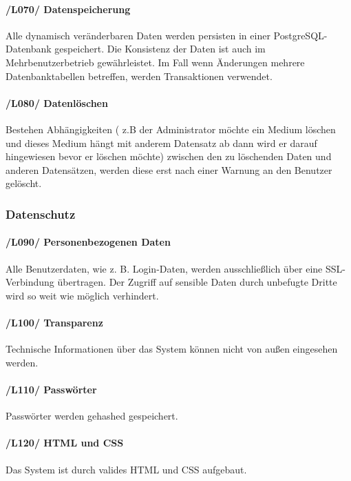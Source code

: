 \documentclass{article}
\begin{document}
   \paragraph{/L070/ \label{070} Datenspeicherung}
   Alle dynamisch veränderbaren Daten werden persisten in einer PostgreSQL-Datenbank gespeichert. Die Konsistenz der Daten ist auch im Mehrbenutzerbetrieb gewährleistet. Im Fall wenn  Änderungen mehrere Datenbanktabellen betreffen, werden Transaktionen verwendet.
  
   \paragraph{/L080/ \label{080} Datenlöschen}
   
  Bestehen Abhängigkeiten ( z.B der Administrator möchte ein Medium löschen und dieses Medium hängt mit anderem Datensatz ab dann wird er  darauf hingewiesen bevor  er  löschen möchte)  zwischen den zu löschenden Daten und anderen Datensätzen, werden diese erst nach einer Warnung an den Benutzer gelöscht.
  
\subsubsection{Datenschutz}
	\paragraph{/L090/ \label{L090} 
	Personenbezogenen Daten} 
	Alle Benutzerdaten, wie z. B. Login-Daten, werden ausschließlich über eine SSL-Verbindung übertragen. Der Zugriff auf sensible Daten durch unbefugte Dritte wird so weit wie möglich verhindert.
		    
	\paragraph{/L100/ \label{L100} Transparenz}
    Technische Informationen über das System können nicht von außen eingesehen werden.
		   
   \paragraph{/L110/ \label{L110} Passwörter} Passwörter werden gehashed gespeichert.
   
    \paragraph{/L120/ \label{L120} HTML und CSS}
    Das System ist durch valides HTML und CSS aufgebaut.
    
\end{document}
